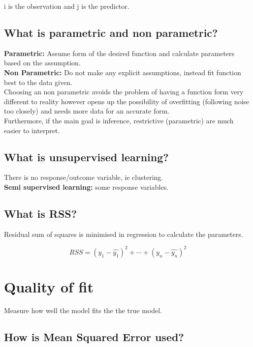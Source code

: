 \documentclass[11pt]{scrartcl} %
\begin{document}
i is the observation and j is the predictor.

\subsection{What is parametric and non parametric?}

\textbf{Parametric:} Assume form of the desired function and calculate parameters based on the assumption.\\

\textbf{Non Parametric:} Do not make any explicit assumptions, instead fit function best to the data given.\\

Choosing an non parametric avoids the problem of having a function form very different to reality however opens up
the possibility of overfitting (following noise too closely) and needs more data for an accurate form.\\

Furthermore, if the main goal is inference, restrictive (parametric) are much easier to interpret.

\subsection{What is unsupervised learning?}

There is no response/outcome variable, ie clustering.\\

\textbf{Semi supervised learning:} some response variables.

\subsection{What is RSS?}

Residual sum of squares is minimised in regression to calculate the parameters.

\begin{equation}
	RSS = (y_1-\hat{y_1})^2 + \cdots +(y_n-\hat{y_n})^2
\end{equation}

\section{Quality of fit}

Measure how well the model fits the the true model.

\subsection{How is Mean Squared Error used?}
\end{document}
